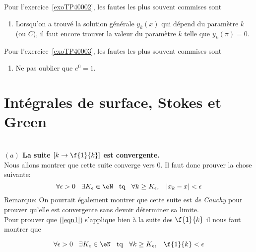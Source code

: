 Pour l'exercice~\ref{exoTP40002}, les fautes les plus souvent commises sont
\begin{enumerate}

	\item
	      Lorsqu'on a trouvé la solution générale $y_k(x)$ qui dépend du paramètre $k$ (ou $C$), il faut encore trouver la valeur du paramètre $k$ telle que $y_k(\pi)=0$.

\end{enumerate}

Pour l'exercice~\ref{exoTP40003}, les fautes les plus souvent commises sont
\begin{enumerate}

	\item
	      Ne pas oublier que $e^0=1$.
\end{enumerate}



\section{Intégrales de surface, Stokes et Green}


\setcounter{CountExercice}{0}


\\

{\bf $(a)$ La suite $[k\rightarrow \f{1}{k}]$ est convergente.}\\

\noindent Nous allons montrer que cette suite converge vers $0$. Il faut donc prouver la chose suivante:
\begin{equation}\label{eqn1}\forall \epsilon >0 \hspace{0,3cm} \exists K_\epsilon \in \eN \hspace{0,3cm} {\rm tq}  \hspace{0,3cm}  \forall k\geq K_\epsilon, \hspace{0,3cm}  |x_k-x|<\epsilon\end{equation}
{Remarque}: On pourrait également montrer que cette suite est {\it de Cauchy} pour prouver qu'elle est convergente sans devoir déterminer sa limite.\\

\noindent Pour prouver que (\ref{eqn1}) s'applique bien à la suite des $\f{1}{k}$ il nous faut montrer que

\begin{equation}\label{eqn2}\forall \epsilon >0 \hspace{0,3cm} \exists K_\epsilon \in \eN \hspace{0,3cm} {\rm tq}  \hspace{0,3cm}  \forall k\geq K_\epsilon,  \hspace{0,3cm} \f{1}{k}<\epsilon\end{equation}

